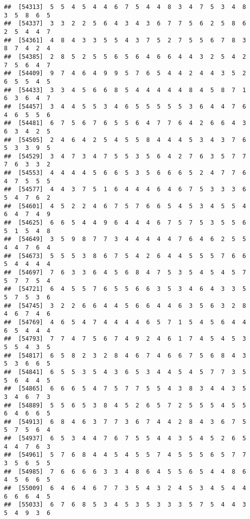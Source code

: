 \documentclass[
]{book}
\begin{document}
\begin{verbatim}
##  [54313]  5  5  4  5  4  4  6  7  5  4  4  8  3  4  7  5  3  4  8  3  5  8  6  5
##  [54337]  3  3  2  2  5  6  4  3  4  3  6  7  7  5  6  2  5  8  6  2  5  4  4  7
##  [54361]  4  8  4  3  3  5  5  4  3  7  5  2  7  5  5  6  7  8  3  8  7  4  2  4
##  [54385]  2  8  5  2  5  5  6  5  6  4  6  6  4  4  3  2  5  4  2  7  5  6  4  7
##  [54409]  9  7  4  6  4  9  9  5  7  6  5  4  4  2  4  4  3  5  2  6  5  5  4  5
##  [54433]  3  3  4  5  6  6  8  5  4  4  4  4  4  8  4  5  8  7  1  6  3  6  4  7
##  [54457]  3  4  4  5  5  3  4  6  5  5  5  5  5  3  6  4  4  7  6  4  6  5  5  6
##  [54481]  6  7  5  6  7  6  5  5  6  4  7  7  6  4  2  6  6  4  3  6  3  4  2  5
##  [54505]  2  4  6  4  2  5  4  5  5  8  4  4  4  5  3  4  3  7  6  5  3  3  9  5
##  [54529]  3  4  7  3  4  7  5  5  3  5  6  4  2  7  6  3  5  7  7  7  6  3  3  2
##  [54553]  4  4  4  4  5  6  6  5  3  5  6  6  6  5  2  4  7  7  6  4  7  5  5  5
##  [54577]  4  4  3  7  5  1  6  4  4  4  6  4  6  7  5  3  3  3  6  5  4  7  6  2
##  [54601]  4  5  2  2  4  6  7  5  7  6  6  5  4  5  3  4  5  5  4  6  4  7  4  9
##  [54625]  6  6  5  4  4  9  6  4  4  4  6  7  5  7  5  3  5  5  6  5  1  5  4  8
##  [54649]  3  5  9  8  7  7  3  4  4  4  4  4  7  6  4  6  2  5  5  4  4  7  6  4
##  [54673]  5  5  5  3  8  6  7  5  4  2  6  4  4  5  5  5  7  6  6  5  4  4  4  4
##  [54697]  7  6  3  3  6  4  5  6  8  4  7  5  3  5  4  5  4  5  7  5  7  7  5  4
##  [54721]  6  4  5  5  7  6  5  5  6  6  3  5  3  4  6  4  3  3  5  5  7  5  3  6
##  [54745]  3  2  2  6  6  4  4  5  6  6  4  4  6  3  5  6  3  2  8  4  6  7  4  6
##  [54769]  4  6  5  4  7  4  4  4  4  6  5  7  1  5  4  5  6  4  4  6  5  4  4  4
##  [54793]  7  7  4  7  5  6  7  4  9  2  4  6  1  7  4  5  4  5  3  5  5  4  3  5
##  [54817]  6  5  8  2  3  2  8  4  6  7  4  6  6  7  5  6  8  4  3  5  3  6  6  5
##  [54841]  6  5  5  3  5  4  3  6  5  3  4  4  5  4  5  7  7  3  5  5  6  4  4  5
##  [54865]  6  6  6  5  4  7  5  7  7  5  5  4  3  8  3  4  4  3  5  3  4  6  7  3
##  [54889]  5  5  6  5  3  8  4  5  2  6  5  7  2  5  5  5  4  5  5  6  4  6  6  5
##  [54913]  6  8  4  6  3  7  7  3  6  7  4  4  2  8  4  3  6  7  5  5  7  5  6  4
##  [54937]  6  5  3  4  4  7  6  7  5  5  4  4  3  5  4  5  2  6  5  4  4  7  6  3
##  [54961]  5  7  6  8  4  4  5  4  5  5  7  4  5  5  5  6  5  7  7  3  5  6  5  5
##  [54985]  7  6  6  6  6  3  3  4  8  6  4  5  5  6  5  4  4  8  6  4  5  6  6  5
##  [55009]  6  4  6  4  6  7  7  3  5  4  3  2  4  5  3  4  5  4  4  6  6  6  4  5
##  [55033]  6  7  6  8  5  3  4  5  3  5  3  3  3  5  7  5  4  4  3  5  4  9  3  6

\end{verbatim}
\end{document}
